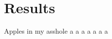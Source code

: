 \chapter{Results}
\label{chap:results}

Apples in my asshole \cite{projthesis}
a \cite{claerbout1991scrutiny}
a \cite{landes1951scrutiny}
a \cite{omar2013machine}
a \cite{wei2022lstmautoencoder}
a \cite{julia}
a \cite{apSensing2019railwaydas}
a \cite{DBLP:journals/corr/SrivastavaMS15}